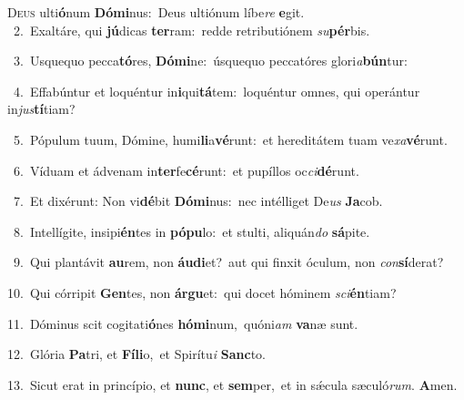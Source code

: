 \lettrine{\initial\textcolor{\initialcolor}{D}}{eus} ulti\-\textbf{ó}\-num \textbf{Dó}\-\textbf{mi}nus:~\star Deus ultiónum líbe\textit{re} \textbf{e}\-git.\\
{\numbfont\textcolor{\numbcolor}{~2.}}~Exaltáre, qui \textbf{jú}\-dicas \textbf{ter}\-ram:~\star redde retributiónem \textit{su}\-\textbf{pér}bis.\par
{\numbfont\textcolor{\numbcolor}{~3.}}~Usquequo pecca\-\textbf{tó}\-res, \textbf{Dó}\-\textbf{mi}ne:~\star úsquequo peccatóres glori\-\textit{a}\-\textbf{bún}tur:\par
{\numbfont\textcolor{\numbcolor}{~4.}}~Effabúntur et loquéntur in\-\textbf{i}\-qui\-\textbf{tá}\-tem:~\star loquéntur omnes, qui operántur in\-\textit{jus}\-\textbf{tí}tiam?\par
{\numbfont\textcolor{\numbcolor}{~5.}}~Pópulum tuum, Dómine, humi\-\textbf{li}\-a\-\textbf{vé}\-runt:~\star et hereditátem tuam ve\-\textit{xa}\-\textbf{vé}runt.\par
{\numbfont\textcolor{\numbcolor}{~6.}}~Víduam et ádvenam in\-\textbf{ter}\-fe\-\textbf{cé}\-runt:~\star et pupíllos oc\-\textit{ci}\-\textbf{dé}runt.\par
{\numbfont\textcolor{\numbcolor}{~7.}}~Et dixérunt: Non vi\-\textbf{dé}\-bit \textbf{Dó}\-\textbf{mi}nus:~\star nec intélliget De\textit{us} \textbf{Ja}\-cob.\par
{\numbfont\textcolor{\numbcolor}{~8.}}~Intellígite, insipi\-\textbf{én}\-tes in \textbf{pó}\-\textbf{pu}lo:~\star et stulti, aliquán\textit{do} \textbf{sá}\-pite.\par
{\numbfont\textcolor{\numbcolor}{~9.}}~Qui plantávit \textbf{au}\-rem, non \textbf{áu}\-\textbf{di}et?~\star aut qui finxit óculum, non \textit{con}\-\textbf{sí}derat?\par
{\numbfont\textcolor{\numbcolor}{10.}}~Qui córripit \textbf{Gen}\-tes, non \textbf{ár}\-\textbf{gu}et:~\star qui docet hóminem \textit{sci}\-\textbf{én}tiam?\par
{\numbfont\textcolor{\numbcolor}{11.}}~Dóminus scit cogitati\-\textbf{ó}\-nes \textbf{hó}\-\textbf{mi}num,~\star quóni\textit{am} \textbf{va}\-næ sunt.\par
{\numbfont\textcolor{\numbcolor}{12.}}~Glória \textbf{Pa}\-tri, et \textbf{Fí}\-\textbf{li}o,~\star et Spirítu\textit{i} \textbf{Sanc}\-to.\par
{\numbfont\textcolor{\numbcolor}{13.}}~Sicut erat in princípio, et \textbf{nunc}\-, et \textbf{sem}\-per,~\star et in sǽcula sæculó\-\textit{rum}\-. \textbf{A}\-men.\par
